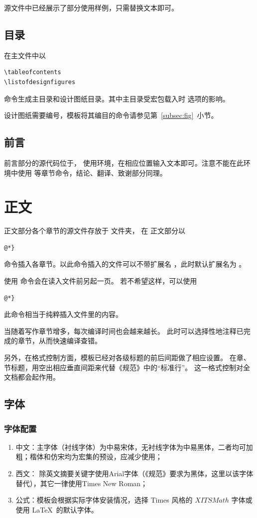 源文件中已经展示了部分使用样例，只需替换文本即可。

\subsection{目录}\label{subsec:content}
在主文件中以
\begin{lstlisting}[numbers=none]
\tableofcontents
\listofdesignfigures
\end{lstlisting}
命令生成主目录和设计图纸目录。其中主目录受宏包载入时  选项的影响。

设计图纸需要编号，模板将其编目的命令请参见第~\ref{subsec:fig}~小节。


\subsection{前言}\label{subsec:foreword}
前言部分的源代码位于，
使用环境，在相应位置输入文本即可。注意不能在此环境中使用
等章节命令，结论、翻译、致谢部分同理。

\section{正文}
正文部分各个章节的源文件存放于  文件夹，
在  正文部分以

\begin{lstlisting}[numbers=none]
@*}
	\end{lstlisting}
命令插入各章节。以此命令插入的文件可以不带扩展名
，此时默认扩展名为 。

使用  命令会在读入文件前另起一页。
若不希望这样，可以使用
\begin{lstlisting}[numbers=none]
@*}
	\end{lstlisting}
此命令相当于纯粹插入文件里的内容。

当随着写作章节增多，每次编译时间也会越来越长。
此时可以选择性地注释已完成的章节，从而快速编译查错。

另外，在格式控制方面，模板已经对各级标题的前后间距做了相应设置。
在章、节标题，用空出相应垂直间距来代替《规范》中的“标准行”。
这一格式控制对全文档都会起作用。
\subsection{字体}
\subsubsection{字体配置}
\begin{enumerate}
	\item 中文：主字体（衬线字体）为中易宋体，无衬线字体为中易黑体，二者均可加粗；楷体和仿宋均为宏集的预设，应减少使用；
	\item 西文： 除英文摘要关键字使用\textsf{Arial}字体（《规范》要求为黑体，这里以该字体替代），其它一律使用Times New Roman；
	\item 公式：模板会根据实际字体安装情况，选择 Times 风格的 $XITSMath$ 字体或使用 \LaTeX\ 的默认字体。
\end{enumerate}

